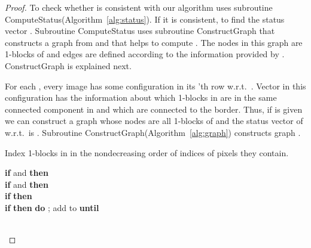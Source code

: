 \documentclass[11pt,english]{article}
\numberwithin{figure}{section}
\newcommand{\Compst}{{\sf ComputeStatus}\xspace}
\newcommand{\Constgr}{{\sf ConstructGraph}\xspace}
\begin{document}
\begin{proof}
To check whether  is consistent with  our algorithm uses subroutine \Compst (Algorithm~\ref{alg:status}). If it is consistent, to
find the status vector . Subroutine \Compst uses subroutine \Constgr that constructs a graph from  and  that helps to compute . The nodes in this graph are 1-blocks of  and edges are defined according to the information provided by . \Constgr is explained next.

For each , every image  has some configuration  in its 'th row w.r.t.\ . Vector  in this  configuration has the information about which 1-blocks in  are in the same connected component in  and which are connected to the border. Thus, if  is given we can construct a graph  whose nodes are all 1-blocks of  and the status vector of  w.r.t.\  is . Subroutine \Constgr (Algorithm~\ref{alg:graph}) constructs graph .

\begin{algorithm}\label{alg:graph}
\caption{Subroutine \Constgr used in Algorithm~\ref{alg:status}.}
\DontPrintSemicolon
\BlankLine
\nl Index 1-blocks in  in the nondecreasing order of indices of pixels they contain. \\

\nl {} {
\nl\textbf{if}  and  \textbf{then} \Return \\
\nl\textbf{if}  and  \textbf{then} \Return \\

\nl\textbf{if}  \textbf{then} \\
\nl\textbf{if}  \textbf{then} \textbf{do} ; add  to  \textbf{until} \\
}
\nl \Return \\
\end{algorithm}




\end{proof}
\end{document}
